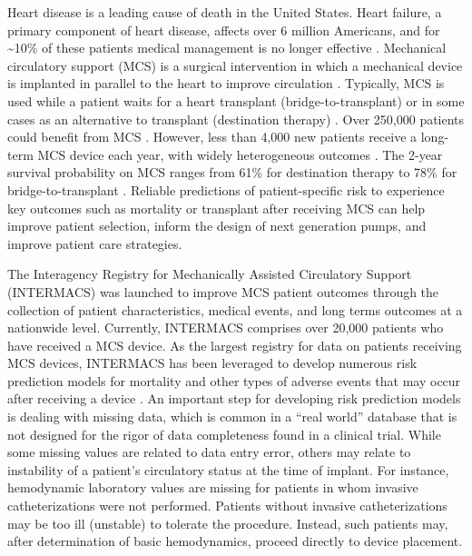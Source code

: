 \documentclass{article}
\begin{document}
\label{sec:introduction}

\linenumbers
\doublespacing

Heart disease is a leading cause of death in the United States. Heart
failure, a primary component of heart disease, affects over 6 million
Americans, and for \textasciitilde10\% of these patients medical
management is no longer effective
\cite{benjamin2017heart,national2017health}. Mechanical circulatory
support (MCS) is a surgical intervention in which a mechanical device is
implanted in parallel to the heart to improve circulation
\cite{patel2014contemporary}. Typically, MCS is used while a patient
waits for a heart transplant (bridge-to-transplant) or in some cases as
an alternative to transplant (destination therapy)
\cite{slaughter2009advanced}. Over 250,000 patients could benefit from
MCS \cite{miller2011left}. However, less than 4,000 new patients receive
a long-term MCS device each year, with widely heterogeneous outcomes
\cite{stewart2011keeping}. The 2-year survival probability on MCS ranges
from 61\% for destination therapy to 78\% for bridge-to-transplant
\cite{patel2014contemporary}. Reliable predictions of patient-specific
risk to experience key outcomes such as mortality or transplant after
receiving MCS can help improve patient selection, inform the design of
next generation pumps, and improve patient care strategies.

The Interagency Registry for Mechanically Assisted Circulatory Support
(INTERMACS) was launched to improve MCS patient outcomes through the
collection of patient characteristics, medical events, and long terms
outcomes at a nationwide level. Currently, INTERMACS comprises over
20,000 patients who have received a MCS device. As the largest registry
for data on patients receiving MCS devices, INTERMACS has been leveraged
to develop numerous risk prediction models for mortality and other types
of adverse events that may occur after receiving a device
\cite{hsich2012should, cotts2014predictors, eckman2011survival, kirklin2017eighth, kormos2019society, Adamo950}.
An important step for developing risk prediction models is dealing with
missing data, which is common in a ``real world'' database that is not
designed for the rigor of data completeness found in a clinical trial.
While some missing values are related to data entry error, others may
relate to instability of a patient's circulatory status at the time of
implant. For instance, hemodynamic laboratory values are missing for
patients in whom invasive catheterizations were not performed. Patients
without invasive catheterizations may be too ill (unstable) to tolerate
the procedure. Instead, such patients may, after determination of basic
hemodynamics, proceed directly to device placement.
\end{document}

